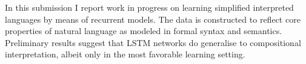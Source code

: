 In this submission I report work in progress on learning simplified interpreted languages by means of recurrent models. The data is constructed to reflect core properties of natural language as modeled in formal syntax and semantics. Preliminary results suggest that LSTM networks do generalise to compositional interpretation, albeit only in the most favorable learning setting.
